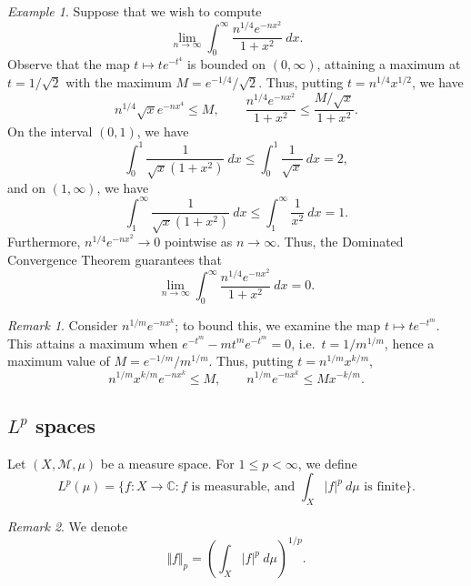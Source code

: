 \documentclass[11pt]{article}
\newcommand{\C}{\mathbb{C}}
\newcommand{\M}{\mathcal{M}}
\newcommand{\norm}[1]{\Vert #1 \Vert}
\theoremstyle{definition}
\theoremstyle{remark}
\newtheorem*{remark}{Remark}
\newtheorem*{example}{Example}
\numberwithin{equation}{section}
\begin{document}
    \begin{example}
        Suppose that we wish to compute \[
            \lim_{n \to \infty} \int_0^\infty \frac{n^{1 / 4}e^{-nx^2}}{1 + x^2}\:dx.
        \] Observe that the map $t \mapsto te^{-t^4}$ is bounded on $(0, \infty)$,
        attaining a maximum at $t = 1 / \sqrt{2}$ with the maximum $M = e^{-1 / 4} /
        \sqrt{2}$.  Thus, putting $t = n^{1 / 4}x^{1 / 2}$, we have \[
            n^{1 / 4}\sqrt{x}e^{-nx^4} \leq M, \qquad
            \frac{n^{1 / 4}e^{-nx^2}}{1 + x^2} \leq \frac{M / \sqrt{x}}{1 + x^2}.
        \] On the interval $(0, 1)$, we have \[
            \int_0^1 \frac{1}{\sqrt{x}(1 + x^2)}\:dx \leq \int_0^1
            \frac{1}{\sqrt{x}}\:dx = 2,
        \] and on $(1, \infty)$, we have \[
            \int_1^\infty \frac{1}{\sqrt{x}(1 + x^2)}\:dx \leq \int_1^\infty
            \frac{1}{x^2}\:dx = 1.
        \] Furthermore, $n^{1 / 4}e^{-nx^2} \to 0$ pointwise as $n \to \infty$. Thus,
        the Dominated Convergence Theorem guarantees that \[
            \lim_{n \to \infty} \int_0^\infty \frac{n^{1 / 4}e^{-nx^2}}{1 + x^2}\:dx
            = 0.
        \]

        \begin{remark}
            Consider $n^{1 / m}e^{-nx^k}$; to bound this, we examine the map
            $t \mapsto te^{-t^m}$. This attains a maximum when $e^{-t^m} -
            mt^me^{-t^m} = 0$, i.e.\ $t = 1 / m^{1 / m}$, hence a maximum value of $M
            = e^{-1 / m} / m^{1 / m}$. Thus, putting $t = n^{1 / m}x^{k / m}$, \[
                n^{1 / m}x^{k / m} e^{-nx^k} \leq M, \qquad n^{1 / m}e^{-nx^k} \leq
                Mx^{-k / m}.
            \]
        \end{remark}
    \end{example}

    \subsection{$L^p$ spaces}
    \begin{definition}
        Let $(X, \M, \mu)$ be a measure space. For $1 \leq p < \infty$, we define \[
            L^p(\mu) = \{f\colon X \to \C : f\text{ is measurable, and }\int_X
            |f|^p\:d\mu \text{ is finite}\}.
        \]
        \begin{remark}
            We denote \[
                \norm{f}_p = \left(\int_X |f|^p\:d\mu\right)^{1 / p}.
            \]
        \end{remark}
    \end{definition}
\end{document}
